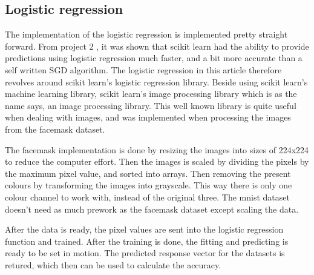 \documentclass[../main.tex]{subfiles}
\begin{document}
\subsection{Logistic regression}
The implementation of the logistic regression is implemented pretty straight forward. From project 2 \cite{project2}, it was shown that scikit learn had the ability to provide predictions using logistic regression much faster, and a bit more accurate than a self written SGD algorithm. The logistic regression in this article therefore revolves around scikit learn's logistic regression library. Beside using scikit learn's machine learning library, scikit learn's image processing library which is as the name says, an image processing library. This well known library is quite useful when dealing with images, and was implemented when processing the images from the facemask dataset.

The facemask implementation is done by resizing the images into sizes of 224x224 to reduce the computer effort. Then the images is scaled by dividing the pixels by the maximum pixel value, and sorted into arrays. Then removing the present colours by transforming the images into grayscale. This way there is only one colour channel to work with, instead of the original three. The mnist dataset doesn't need as much prework as the facemask dataset except scaling the data.

After the data is ready, the pixel values are sent into the logistic regression function and trained. After the training is done, the fitting and predicting is ready to be set in motion. The predicted response vector for the datasets is retured, which then can be used to calculate the accuracy.
\end{document}
